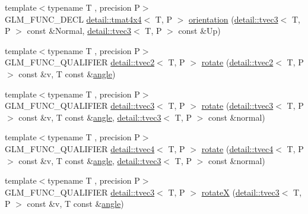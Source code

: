\begin{DoxyCompactItemize}
\item 
{\footnotesize template$<$typename T , precision P$>$ }\\G\+L\+M\+\_\+\+F\+U\+N\+C\+\_\+\+D\+E\+CL \hyperlink{structglm_1_1detail_1_1tmat4x4}{detail\+::tmat4x4}$<$ T, P $>$ \hyperlink{group__gtx__rotate__vector_gac80aaf3b2af70c7f03f1077d4b6ac507}{orientation} (\hyperlink{structglm_1_1detail_1_1tvec3}{detail\+::tvec3}$<$ T, P $>$ const \&Normal, \hyperlink{structglm_1_1detail_1_1tvec3}{detail\+::tvec3}$<$ T, P $>$ const \&Up)
\item 
{\footnotesize template$<$typename T , precision P$>$ }\\G\+L\+M\+\_\+\+F\+U\+N\+C\+\_\+\+Q\+U\+A\+L\+I\+F\+I\+ER \hyperlink{structglm_1_1detail_1_1tvec2}{detail\+::tvec2}$<$ T, P $>$ \hyperlink{group__gtx__rotate__vector_ga5520f6dd671807ec62a8f97c00c1b78b}{rotate} (\hyperlink{structglm_1_1detail_1_1tvec2}{detail\+::tvec2}$<$ T, P $>$ const \&v, T const \&\hyperlink{group__gtc__quaternion_ga23a3fc7ada5bbb665ff84c92c6e0542c}{angle})
\item 
{\footnotesize template$<$typename T , precision P$>$ }\\G\+L\+M\+\_\+\+F\+U\+N\+C\+\_\+\+Q\+U\+A\+L\+I\+F\+I\+ER \hyperlink{structglm_1_1detail_1_1tvec3}{detail\+::tvec3}$<$ T, P $>$ \hyperlink{group__gtx__rotate__vector_ga4eccdf3769ce3b5d1e4018394290f88c}{rotate} (\hyperlink{structglm_1_1detail_1_1tvec3}{detail\+::tvec3}$<$ T, P $>$ const \&v, T const \&\hyperlink{group__gtc__quaternion_ga23a3fc7ada5bbb665ff84c92c6e0542c}{angle}, \hyperlink{structglm_1_1detail_1_1tvec3}{detail\+::tvec3}$<$ T, P $>$ const \&normal)
\item 
{\footnotesize template$<$typename T , precision P$>$ }\\G\+L\+M\+\_\+\+F\+U\+N\+C\+\_\+\+Q\+U\+A\+L\+I\+F\+I\+ER \hyperlink{structglm_1_1detail_1_1tvec4}{detail\+::tvec4}$<$ T, P $>$ \hyperlink{group__gtx__rotate__vector_gac4abb6be47bd14303d6eded41f2f65f1}{rotate} (\hyperlink{structglm_1_1detail_1_1tvec4}{detail\+::tvec4}$<$ T, P $>$ const \&v, T const \&\hyperlink{group__gtc__quaternion_ga23a3fc7ada5bbb665ff84c92c6e0542c}{angle}, \hyperlink{structglm_1_1detail_1_1tvec3}{detail\+::tvec3}$<$ T, P $>$ const \&normal)
\item 
{\footnotesize template$<$typename T , precision P$>$ }\\G\+L\+M\+\_\+\+F\+U\+N\+C\+\_\+\+Q\+U\+A\+L\+I\+F\+I\+ER \hyperlink{structglm_1_1detail_1_1tvec3}{detail\+::tvec3}$<$ T, P $>$ \hyperlink{group__gtx__rotate__vector_gadb69cdc8ea08715c9d8a74f587cf0eac}{rotateX} (\hyperlink{structglm_1_1detail_1_1tvec3}{detail\+::tvec3}$<$ T, P $>$ const \&v, T const \&\hyperlink{group__gtc__quaternion_ga23a3fc7ada5bbb665ff84c92c6e0542c}{angle})

\end{DoxyCompactItemize}
